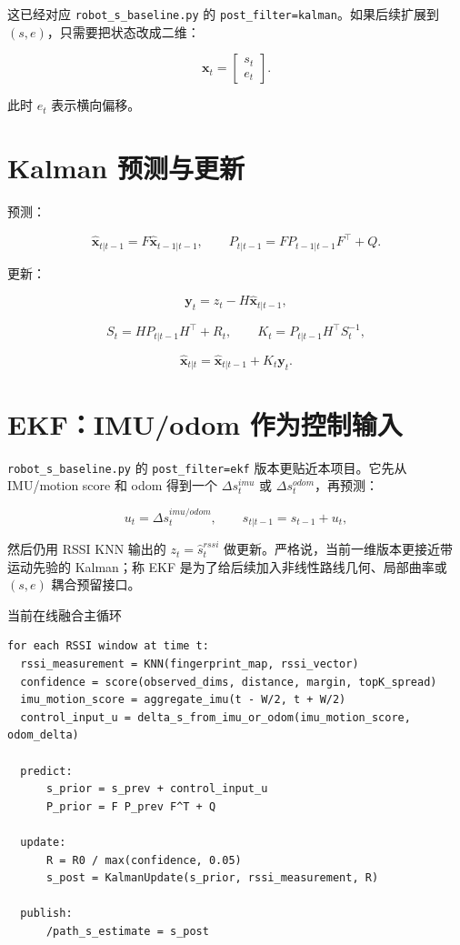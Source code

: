 \documentclass[11pt,a4paper,openany]{report}
\newcommand{\file}[1]{\nolinkurl{#1}}
\newcommand{\param}[1]{\nolinkurl{#1}}
\begin{document}
这已经对应 \file{robot_s_baseline.py} 的 \param{post_filter=kalman}。如果后续扩展到 \((s,e)\)，只需要把状态改成二维：

\[
  \bm{x}_t =
  \begin{bmatrix}
    s_t \\
    e_t
  \end{bmatrix}.
\]

此时 \(e_t\) 表示横向偏移。

\section{Kalman 预测与更新}

预测：

\[
  \hat{\bm{x}}_{t|t-1} = F\hat{\bm{x}}_{t-1|t-1},
  \qquad
  P_{t|t-1} = FP_{t-1|t-1}F^\top + Q.
\]

更新：

\[
  \bm{y}_t = z_t - H\hat{\bm{x}}_{t|t-1},
\]

\[
  S_t = HP_{t|t-1}H^\top + R_t,
  \qquad
  K_t = P_{t|t-1}H^\top S_t^{-1},
\]

\[
  \hat{\bm{x}}_{t|t}
  =
  \hat{\bm{x}}_{t|t-1}
  +
  K_t\bm{y}_t.
\]

\section{EKF：IMU/odom 作为控制输入}

\file{robot_s_baseline.py} 的 \param{post_filter=ekf} 版本更贴近本项目。它先从 IMU/motion score 和 odom 得到一个 \(\Delta s_t^{imu}\) 或 \(\Delta s_t^{odom}\)，再预测：

\[
  u_t = \Delta s_t^{imu/odom},
  \qquad
  s_{t|t-1} = s_{t-1} + u_t,
\]

然后仍用 RSSI KNN 输出的 \(z_t=\hat{s}_t^{rssi}\) 做更新。严格说，当前一维版本更接近带运动先验的 Kalman；称 EKF 是为了给后续加入非线性路线几何、局部曲率或 \((s,e)\) 耦合预留接口。

\begin{algobox}{当前在线融合主循环}
\begin{lstlisting}
for each RSSI window at time t:
  rssi_measurement = KNN(fingerprint_map, rssi_vector)
  confidence = score(observed_dims, distance, margin, topK_spread)
  imu_motion_score = aggregate_imu(t - W/2, t + W/2)
  control_input_u = delta_s_from_imu_or_odom(imu_motion_score, odom_delta)

  predict:
      s_prior = s_prev + control_input_u
      P_prior = F P_prev F^T + Q

  update:
      R = R0 / max(confidence, 0.05)
      s_post = KalmanUpdate(s_prior, rssi_measurement, R)

  publish:
      /path_s_estimate = s_post
\end{lstlisting}
\end{algobox}
\end{document}
